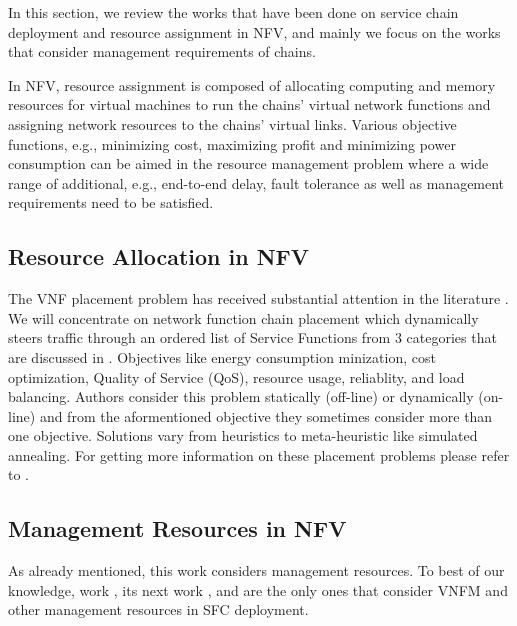 In this section, we review the works that have been done on service chain deployment and resource assignment in NFV, and mainly we focus on the works that consider management requirements of chains.

In NFV, resource assignment is composed of
allocating computing and memory resources for virtual machines to run the chains' virtual network functions and assigning network resources to the chains' virtual links. Various objective functions, e.g., minimizing cost, maximizing profit and minimizing power consumption can be aimed in the resource management problem where a wide range of additional, e.g., end-to-end delay, fault tolerance as well as management requirements need to be satisfied.

\subsection{Resource Allocation in NFV}
The VNF placement problem has received substantial attention in the literature \cite{GilHerrera2016}.
We will concentrate on network function chain placement which dynamically steers
traffic through an ordered list of Service Functions from 3 categories that are discussed in \cite{Laghrissi2019}.
Objectives like energy consumption minization, cost optimization, Quality of Service (QoS), resource usage, reliablity,
and load balancing.
Authors consider this problem statically (off-line) or dynamically (on-line) and from the aformentioned objective they sometimes
consider more than one objective. Solutions vary from heuristics to meta-heuristic like simulated annealing.
For getting more information on these placement problems please refer to \cite{Laghrissi2019}.

\subsection{Management Resources in NFV}
As already mentioned, this work considers management resources. To best of our knowledge, work \cite{AbuLebdeh2017}, its next work \cite{AbuLebdeh20172}, and \cite{Chiang2019} are the only ones that consider VNFM and other management resources in SFC deployment.

